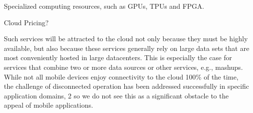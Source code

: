 Specialized computing resources, such as GPUs, TPUs and FPGA.

Cloud Pricing?

Such services will be attracted to the cloud not only because they must be
highly available, but also because these services generally rely on large data
sets that are most conveniently hosted in large datacenters. This is especially
the case for services that combine two or more data sources or other services,
e.g., mashups. While not all mobile devices enjoy connectivity to the cloud
100\% of the time, the challenge of disconnected operation has been addressed
successfully in specific application domains, 2 so we do not see this as a
significant obstacle to the appeal of mobile applications.

